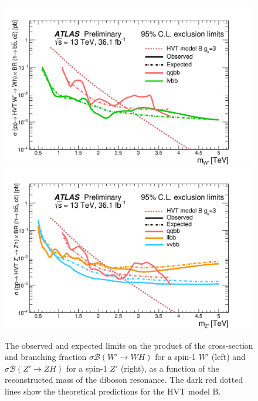 \begin{figure}[!htb]
  \centering
    \includegraphics[width=.495\textwidth]{figures/ATLAS_Diboson_Summary_VH.pdf}%
    \includegraphics[width=.495\textwidth]{figures/ATLAS_Diboson_Summary_VV_ZP.pdf}
  \caption{The observed and expected limits on the product of the cross-section and branching fraction $\sigma \mathcal{B} (W' \rightarrow WH)$ for a spin-1 $W'$ (left) and $\sigma \mathcal{B} (Z' \rightarrow ZH)$ for a spin-1 $Z'$ (right), as a function of the reconstructed mass of the diboson resonance. The dark red dotted lines show the theoretical predictions for the HVT model B.}
  \label{fig:theory_ATLAS_Diboson_Summary_VH}
\end{figure}

